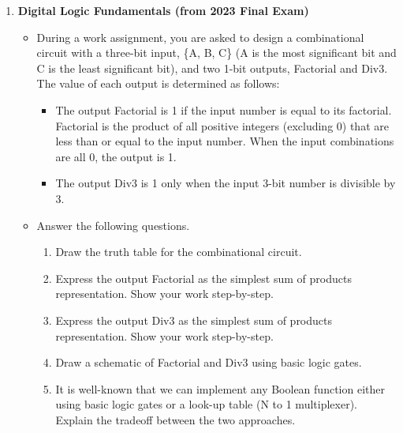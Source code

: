 \documentclass[11pt]{article}
\begin{document}
\begin{enumerate}[label=\textbf{C\arabic*.}]
  \item \textbf{Digital Logic Fundamentals (from 2023 Final Exam)}
  \begin{itemize}
    \item During a work assignment, you are asked to design a combinational circuit with a three-bit input, \{A, B, C\} (A is the most significant bit and C is the least significant bit), and two 1-bit outputs, Factorial and Div3. The value of each output is determined as follows:
    \begin{itemize}
        \item The output Factorial is 1 if the input number is equal to its factorial. Factorial is the product of all positive integers (excluding 0) that are less than or equal to the input number. When the input combinations are all 0, the output is 1.
        \item The output Div3 is 1 only when the input 3-bit number is divisible by 3.
    \end{itemize}
    \item Answer the following questions.
    \begin{enumerate}
        \item[A.] Draw the truth table for the combinational circuit.
        \item[B.] Express the output Factorial as the simplest sum of products representation. Show your work step-by-step.
        \item[C.] Express the output Div3 as the simplest sum of products representation. Show your work step-by-step.
        \item[D.] Draw a schematic of Factorial and Div3 using basic logic gates.
        \item[E.] It is well-known that we can implement any Boolean function either using basic logic gates or a look-up table (N to 1 multiplexer). Explain the tradeoff between the two approaches.
    \end{enumerate}
  \end{itemize}


\end{enumerate}
\end{document}
